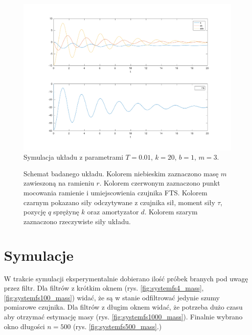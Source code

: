 \documentclass[a4paper, 10pt]{article}
\begin{document}
\begin{figure}[H]
	\includegraphics[width=0.99\linewidth]{system_sys}
	\centering
	\caption{Symulacja układu z parametrami $T=0.01$, $k = 20$, $b = 1$, $m = 3$.}
	\label{fig:system}
\end{figure}


\begin{figure}[H]
	\centering
	\caption{Schemat badanego układu. Kolorem niebieskim zaznaczono masę $m$ zawieszoną na ramieniu $r$. Kolorem czerwonym zaznaczono punkt mocowania ramienie i umiejscowienia czujnika FTS. Kolorem czarnym pokazano siły odczytywane z czujnika sił, moment siły $\tau$, pozycję $q$ sprężynę $k$ oraz amortyzator $d$. Kolorem szarym zaznaczono rzeczywiste siły układu.}
	\label{fig:2d}
\end{figure}


\section{Symulacje}

W trakcie symulacji eksperymentalnie dobierano ilość próbek branych pod uwagę przez filtr. Dla filtrów z krótkim oknem (rys. \ref{fig:systemfs4_mass}, \ref{fig:systemfs100_mass}) widać, że są w stanie odfiltrować jedynie szumy pomiarowe czujnika. Dla filtrów z długim oknem widać, że potrzeba dużo czasu aby otrzymać estymację masy (rys. \ref{fig:systemfs1000_mass}). Finalnie wybrano okno długości $n = 500$ (rys. \ref{fig:systemfs500_mass}.)
\end{document}

